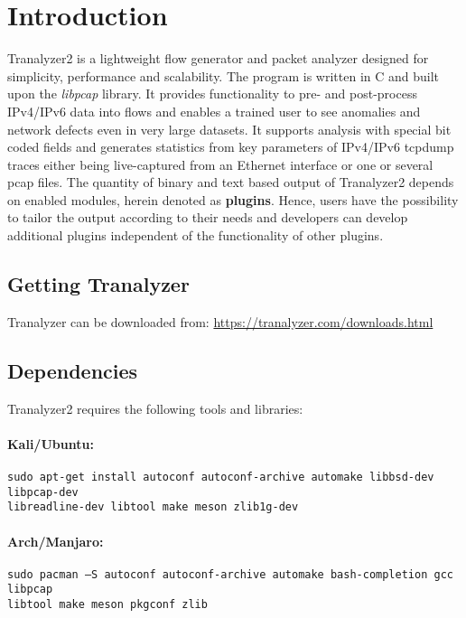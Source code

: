 \section{Introduction}
Tranalyzer2 is a lightweight flow generator and packet analyzer designed for simplicity, performance and scalability. The program is written in C and built upon the {\em libpcap} library. It provides functionality to pre- and post-process IPv4/IPv6 data into flows and enables a trained user to see anomalies and network defects even in very large datasets. It supports analysis with special bit coded fields and generates statistics from key parameters of IPv4/IPv6 tcpdump traces either being live-captured from an Ethernet interface or one or several pcap files. The quantity of binary and text based output of Tranalyzer2 depends on enabled modules, herein denoted as {\bf plugins}. Hence, users have the possibility to tailor the output according to their needs and developers can develop additional plugins independent of the functionality of other plugins.

\subsection{Getting Tranalyzer}
Tranalyzer can be downloaded from: \url{https://tranalyzer.com/downloads.html}

\subsection{Dependencies}
Tranalyzer2 requires the following tools and libraries:

\paragraph{Kali/Ubuntu:}
\begin{center}
    \begin{small}
        {\tt sudo apt-get install autoconf autoconf-archive automake libbsd-dev libpcap-dev\\libreadline-dev libtool make meson zlib1g-dev}
    \end{small}
\end{center}

\paragraph{Arch/Manjaro:}
\begin{center}
    \begin{small}
        {\tt sudo pacman --S autoconf autoconf-archive automake bash-completion gcc libpcap\\libtool make meson pkgconf zlib}
    \end{small}
\end{center}

